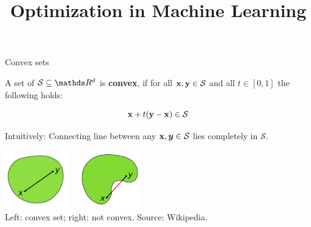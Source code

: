 \documentclass[11pt,compress,t,notes=noshow, xcolor=table]{beamer}
\title{Optimization in Machine Learning}
\date{}
\begin{document}
\sloppy




\begin{vbframe}{Convex sets}

A set of $\mathcal{S} \subseteq \R^d$ is \textbf{convex}, if for all $\mathbf{x}, \mathbf{y} \in \mathcal{S}$ and all $t \in [0, 1]$ the following holds:

$$
\mathbf{x} + t (\mathbf{y} - \mathbf{x}) \in \mathcal{S}
$$

Intuitively: Connecting line between any $\mathbf{x}, \bm{y} \in \mathcal{S}$ lies completely in $\mathcal{S}$.

\begin{center}
\includegraphics[width = 0.2\textwidth]{figure_man/convex.png}~~~\includegraphics[width = 0.2\textwidth]{figure_man/concave.png} \\
\footnotesize{Left: convex set; right: not convex. Source: Wikipedia. 
}
\end{center}

\end{vbframe}
\end{document}

